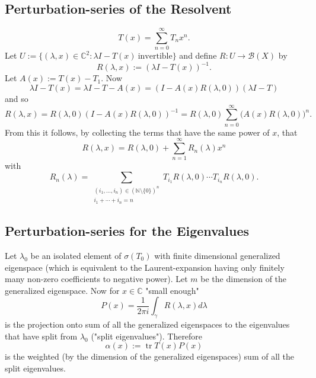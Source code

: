 \documentclass[11pt]{article}
\DeclareMathOperator{\tr}{tr}
\begin{document}
\subsection{Perturbation-series of the Resolvent}
\begin{equation}
    T(x) = \sum_{n=0}^\infty T_n x^n.
\end{equation}
Let $U:= \{ (\lambda, x) \in \mathbb{C}^2 : \lambda I - T(x) \ \text{invertible} \}$
and define
$R: U \to \mathscr{B}(X)$ by
\begin{equation}
    R(\lambda, x) := (\lambda I - T(x))^{-1}.
\end{equation}
Let $A(x):= T(x)-T_1$.
Now 
\begin{equation}
   \lambda I - T (x) = \lambda I - T - A(x) = ( I - A(x) R(\lambda,0)) (\lambda I -T)
\end{equation}
and so 
\begin{equation}
    R(\lambda,x) = R(\lambda,0)  ( I - A(x) R(\lambda,0))^{-1} = 
    R(\lambda,0)  \sum_{n=0}^\infty  (A(x) R(\lambda,0) \big)^n.
\end{equation}
From this it follows, by collecting the terms that have the same power of $x$, that
\begin{equation}
    R(\lambda, x) = R(\lambda,0)+ \sum_{n=1}^\infty R_n (\lambda) x^n
\end{equation}
with 
\begin{equation}
    R_n (\lambda) = 
    \sum_{ \substack{(i_1, \dots, i_n) \in (\mathbb{N} \setminus \{0\})^n \\ i_1 + \cdots + i_n = n}   }
     T_{i_1} R(\lambda,0)   \cdots T_{i_n}  R(\lambda,0).
\end{equation}

\subsection{Perturbation-series for the Eigenvalues}
Let $\lambda_0$ be an isolated element of $\sigma (T_0)$ with finite dimensional
generalized eigenspace (which is equivalent to the Laurent-expansion having only finitely many non-zero coefficients to negative power).
Let $m$ be the dimension of the generalized eigenspace.
Now for $x \in \mathbb{C}$ "small enough"
\begin{equation}
    P(x) = \frac{1}{2\pi i} \int_\gamma  R(\lambda,x) d \lambda
\end{equation}
is the projection onto sum of all the generalized eigenspaces to the eigenvalues
that have split from $\lambda_0$ ("split eigenvalues").
Therefore 
\begin{equation}
   \alpha (x) := \tr T(x) P(x) 
\end{equation}
is the weighted (by the dimension of the generalized eigenspaces) sum of all
the split eigenvalues.
\end{document}
